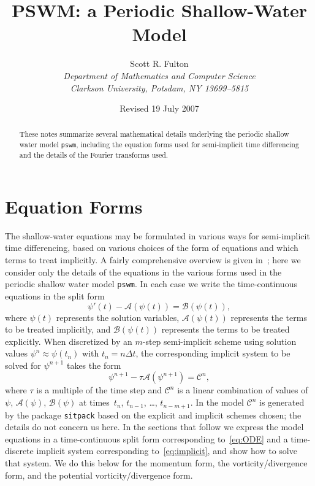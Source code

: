\documentclass[12pt]{article}
\title{PSWM: a Periodic Shallow-Water Model}
\author{Scott R. Fulton
\\[12pt]
\emph{Department of Mathematics and Computer Science}\\
\emph{Clarkson University, Potsdam, NY 13699--5815}
}
\date{Revised 19 July 2007}
\newcommand{\solvec}{\psi}
\newcommand{\opA}{\mathcal{A}}
\newcommand{\opB}{\mathcal{B}}
\newcommand{\opC}{\mathcal{C}}
\newcommand{\dt}{\Delta t}
\newcommand{\code}[1]{\texttt{#1}}
\newcommand{\pswm}{\code{pswm}}
\begin{document}
\maketitle


\begin{abstract}
\noindent
These notes summarize several mathematical details underlying the periodic
shallow water model \pswm, including the equation forms used for semi-implicit
time differencing and the details of the Fourier transforms used.
\end{abstract}



\pagebreak[3]
\section{Equation Forms\label{sec:equations}}
\setcounter{equation}{0}

The shallow-water equations may be formulated in various ways for
semi-implicit time differencing, based on various choices of the form of 
equations and which terms to treat implicitly.  A fairly comprehensive
overview is given in~\cite{Fulton07}; here we consider only the details of the
equations in the various forms used in the periodic shallow water model \pswm.
In each case we write the time-continuous equations in the split form
\begin{equation}
  \solvec'(t) - \opA(\solvec(t)) = \opB(\solvec(t)) ,
\label{eq:ODE}
\end{equation}
where $\solvec(t)$ represents the solution variables,
$\opA(\solvec(t))$ represents the terms to be treated implicitly, and
$\opB(\solvec(t))$ represents the terms to be treated explicitly.
When discretized by an $m$-step semi-implicit scheme using solution values
$\solvec^n\approx\solvec(t_n)$ with $t_n=n\dt$, the corresponding implicit
system to be solved for $\solvec^{n+1}$ takes the form
\begin{equation}
  \solvec^{n+1}-\tau\opA(\solvec^{n+1}) = \opC^{n},
\label{eq:implicit}
\end{equation}
where $\tau$ is a multiple of the time step and $\opC^{n}$ is a linear
combination of values of $\solvec$, $\opA(\solvec)$, $\opB(\solvec)$ at
times~$t_n$, $t_{n-1}$, \dots, $t_{n-m+1}$.  In the model $\opC^{n}$ is
generated by the package \verb+sitpack+ based on the explicit and implicit
schemes chosen; the details do not concern us here.  In the sections that
follow we express the model equations in a time-continuous split form
corresponding to~\eqref{eq:ODE} and a time-discrete implicit system
corresponding to~\eqref{eq:implicit}, and show how to solve that system.  
We do this below for 
the momentum form, %
the vorticity/divergence form, %
and the potential vorticity/divergence form. %
\end{document}
